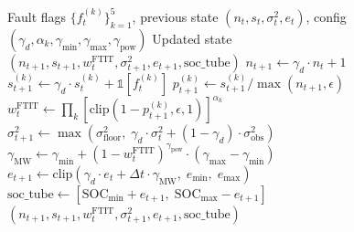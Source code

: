 \documentclass[11pt,a4paper]{article}
\begin{document}
\begin{algorithm}[htbp]
\caption{FTIT state update at each dispatch step}
\label{alg:ftit}
\begin{algorithmic}[1]
\Require Fault flags $\{f^{(k)}_t\}_{k=1}^5$, previous state $(n_{t}, s_t, \sigma^2_t, e_t)$, config $(\gamma_d, \alpha_k, \gamma_{\min}, \gamma_{\max}, \gamma_{\text{pow}})$
\Ensure Updated state $(n_{t+1}, s_{t+1}, w_t^{\text{FTIT}}, \sigma^2_{t+1}, e_{t+1}, \text{soc\_tube})$
\State $n_{t+1} \gets \gamma_d \cdot n_t + 1$
  \State $s_{t+1}^{(k)} \gets \gamma_d \cdot s_t^{(k)} + \mathbb{1}[f^{(k)}_t]$
  \State $p_{t+1}^{(k)} \gets s_{t+1}^{(k)} / \max(n_{t+1}, \epsilon)$
\EndFor
\State $w_t^{\text{FTIT}} \gets \prod_k [\mathrm{clip}(1 - p_{t+1}^{(k)}, \epsilon, 1)]^{\alpha_k}$
\State $\sigma^2_{t+1} \gets \max(\sigma^2_{\text{floor}},\; \gamma_d \cdot \sigma^2_t + (1-\gamma_d) \cdot \sigma^2_{\text{obs}})$ 
\State $\gamma_{\text{MW}} \gets \gamma_{\min} + (1 - w_t^{\text{FTIT}})^{\gamma_{\text{pow}}} \cdot (\gamma_{\max} - \gamma_{\min})$
\State $e_{t+1} \gets \mathrm{clip}(\gamma_d \cdot e_t + \Delta t \cdot \gamma_{\text{MW}},\; e_{\min},\; e_{\max})$
\State $\text{soc\_tube} \gets [\mathrm{SOC}_{\min} + e_{t+1},\; \mathrm{SOC}_{\max} - e_{t+1}]$
\State \Return $(n_{t+1}, s_{t+1}, w_t^{\text{FTIT}}, \sigma^2_{t+1}, e_{t+1}, \text{soc\_tube})$
\end{algorithmic}
\end{algorithm}
\end{document}
